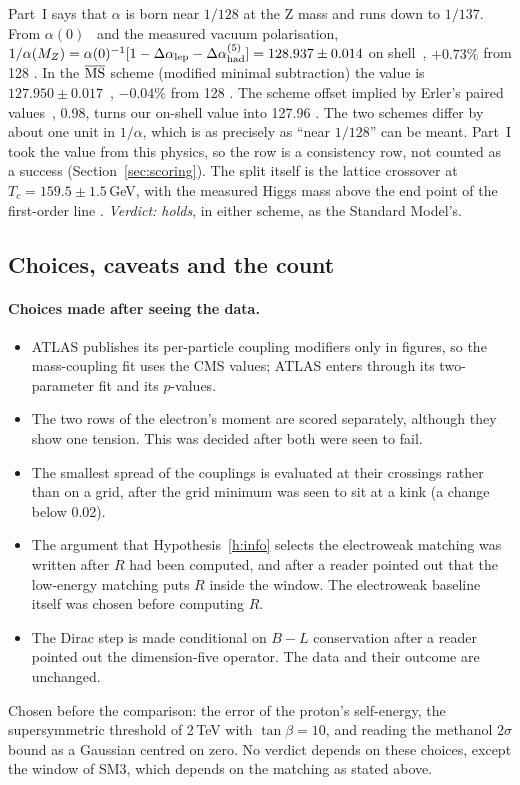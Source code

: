 Part~I says that $\alpha$ is born near $1/128$ at the Z mass and runs down to $1/137$. From $\alpha(0)$~\cite{codata2022} and the measured vacuum
polarisation, $1/\alpha(M_Z)=\alpha(0)^{-1}[1-\Delta\alpha_{\rm lep}-\Delta\alpha_{\rm had}^{(5)}]=128.937\pm0.014$ on shell~\cite{steinhauser1998,davier2020},
$+0.73\%$ from 128 . In the $\overline{\rm MS}$ scheme (modified minimal subtraction) the value is $127.950\pm0.017$~\cite{erler2017},
$-0.04\%$ from 128 . The scheme offset implied by Erler's paired values~\cite{erler1999}, 0.98, turns our on-shell value into 127.96
. The two schemes differ by about one unit in $1/\alpha$, which is as precisely as ``near $1/128$'' can be meant. Part~I took the value from this physics, so the row is a consistency row,
not counted as a success (Section~\ref{sec:scoring}). The split itself
is the lattice crossover at $T_c=159.5\pm1.5$\,GeV, with the measured Higgs mass above the end point of the first-order line .
\emph{Verdict: holds}, in either scheme, as the Standard Model's.

\subsection{Choices, caveats and the count}\label{sec:sm-end}

\paragraph{Choices made after seeing the data.}
\begin{itemize}[nosep]
\item ATLAS publishes its per-particle coupling modifiers only in figures, so the mass-coupling fit uses the CMS values; ATLAS enters through its
two-parameter fit and its $p$-values.
\item The two rows of the electron's moment are scored separately, although they show one tension. This was decided after both were seen to fail.
\item The smallest spread of the couplings is evaluated at their crossings rather than on a grid, after the grid minimum was seen to sit at a
kink (a change below 0.02).
\item The argument that Hypothesis~\ref{h:info} selects the electroweak matching was written after $R$ had been computed, and after a reader
pointed out that the low-energy matching puts $R$ inside the window. The electroweak baseline itself was chosen before computing $R$.
\item The Dirac step is made conditional on $B-L$ conservation after a reader pointed out the dimension-five operator. The data and their
outcome are unchanged.
\end{itemize}
Chosen before the comparison: the error of the proton's self-energy, the supersymmetric threshold of 2\,TeV with $\tan\beta=10$, and reading the
methanol $2\sigma$ bound as a Gaussian centred on zero. No verdict depends on these choices, except the window of SM3, which depends on the matching
as stated above.

